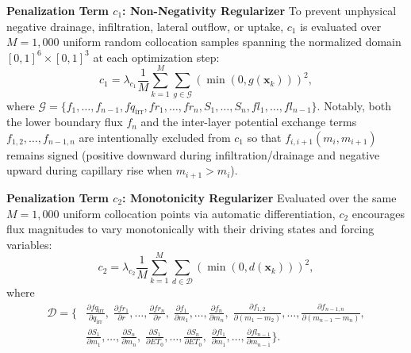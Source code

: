 \documentclass[pdflatex,sn-nature]{sn-jnl}%
\theoremstyle{thmstyleone}%
\theoremstyle{thmstyletwo}%
\theoremstyle{thmstylethree}%
\begin{document}
\textbf{Penalization Term \( c_1 \): Non-Negativity Regularizer}
To prevent unphysical negative drainage, infiltration, lateral outflow, or uptake, \( c_1 \) is evaluated over \( M = 1{,}000 \) uniform random collocation samples spanning the normalized domain \([0,1]^6 \times [0,1]^3\) at each optimization step:
\[
c_1 = \lambda_{c_1} \frac{1}{M} \sum_{k=1}^M \sum_{g \in \mathcal{G}} \left( \min(0, g(\mathbf{x}_k)) \right)^2,
\]
where \( \mathcal{G} = \{ f_1, \dots, f_{n-1}, fq_{\mathrm{irr}}, fr_1, \dots, fr_n, S_1, \dots, S_n, fl_1, \dots, fl_{n-1} \} \). Notably, both the lower boundary flux \( f_n \) and the inter-layer potential exchange terms \( f_{1,2}, \dots, f_{n-1,n} \) are intentionally excluded from \( c_1 \) so that \( f_{i,i+1}(m_i, m_{i+1}) \) remains signed (positive downward during infiltration/drainage and negative upward during capillary rise when \(m_{i+1} > m_i\)).

\textbf{Penalization Term \( c_2 \): Monotonicity Regularizer}
Evaluated over the same \( M = 1{,}000 \) uniform collocation points via automatic differentiation, \( c_2 \) encourages flux magnitudes to vary monotonically with their driving states and forcing variables:
\[
c_2 = \lambda_{c_2} \frac{1}{M} \sum_{k=1}^M \sum_{d \in \mathcal{D}} \left( \min(0, d(\mathbf{x}_k)) \right)^2,
\]
where
\[
\begin{aligned}
\mathcal{D} = \Biggl\{ &
\frac{\partial fq_{\mathrm{irr}}}{\partial q_{\mathrm{irr}}},\;
\frac{\partial fr_1}{\partial r}, \dots, \frac{\partial fr_n}{\partial r},\;
\frac{\partial f_1}{\partial m_1}, \dots, \frac{\partial f_n}{\partial m_n},\;
\frac{\partial f_{1,2}}{\partial (m_1 - m_2)}, \dots, \frac{\partial f_{n-1,n}}{\partial (m_{n-1} - m_n)}, \\
& \frac{\partial S_1}{\partial m_1}, \dots, \frac{\partial S_n}{\partial m_n},\;
\frac{\partial S_1}{\partial ET_0}, \dots, \frac{\partial S_n}{\partial ET_0},\;
\frac{\partial fl_1}{\partial m_1}, \dots, \frac{\partial fl_{n-1}}{\partial m_{n-1}}
\Biggr\}.
\end{aligned}
\]
\end{document}
